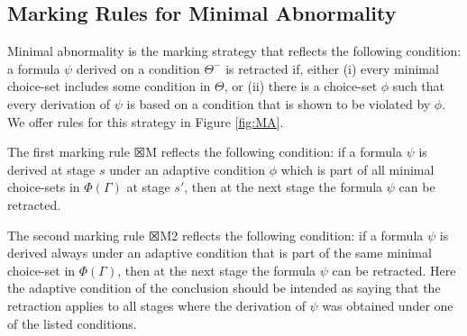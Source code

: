 \documentclass[]{article}
\newtheorem{definition}{Definition}
\begin{document}
\subsection{Marking Rules for Minimal Abnormality}\label{sec:ma}
%
%
Minimal abnormality is the marking strategy that reflects the following condition: a formula $\psi$ derived on a condition $\Theta^-$ is retracted if, either (i) every minimal choice-set includes some condition in $\Theta$, or (ii) there is a choice-set $\phi$ such that every derivation of $\psi$ is based on a condition that is shown to be violated by $\phi$. We offer rules for this strategy in Figure \ref{fig:MA}.
%

The first marking rule $\XBox$M reflects the following condition: if a formula $\psi$ is derived at stage $s$ under an adaptive condition $\phi$ which is part of all minimal choice-sets in $\Phi(\Gamma)$ at stage $s'$, then at the next stage the formula $\psi$ can be retracted.

The second marking rule $\XBox$M2 reflects the following condition: if a formula $\psi$ is derived always under an adaptive condition that is part of the same minimal choice-set in $\Phi(\Gamma)$, then at the next stage the formula $\psi$ can be retracted. Here the adaptive condition of the conclusion should be intended as saying that the retraction applies to all stages where the derivation of $\psi$ was obtained under one of the listed conditions.
\end{document}

